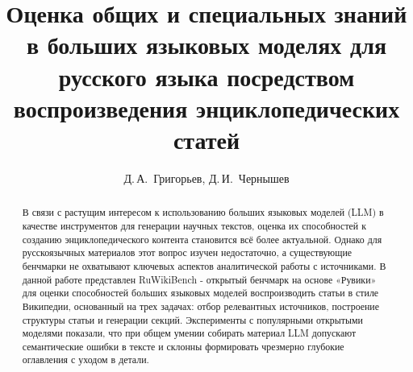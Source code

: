 \documentclass{article}
\begin{document}
\raggedbottom
{}


\title{Оценка общих и специальных знаний в больших языковых моделях для русского языка посредством воспроизведения энциклопедических статей}

\author{Д.\,А.~Григорьев\Addressmark[1]\Emailmark[1], Д.\,И.~Чернышев\Addressmark[1]\Emailmark[2]}










\maketitle

\begin{abstract}
В связи с растущим интересом к использованию больших языковых моделей (LLM) в качестве инструментов для генерации научных текстов, 
оценка их способностей к созданию энциклопедического контента становится всё более актуальной.
Однако для русскоязычных материалов этот вопрос изучен недостаточно, а существующие бенчмарки не охватывают ключевых аспектов аналитической работы с источниками.
В данной работе представлен RuWikiBench - открытый бенчмарк на основе «Рувики» для оценки способностей больших языковых моделей воспроизводить статьи в стиле Википедии, 
основанный на трех задачах:
отбор релевантных источников, построение структуры статьи и генерации секций.
Эксперименты с популярными открытыми моделями показали, что при общем умении собирать материал LLM допускают семантические ошибки в
тексте и склонны формировать чрезмерно глубокие оглавления с уходом в детали.
\end{abstract}
\end{document}
